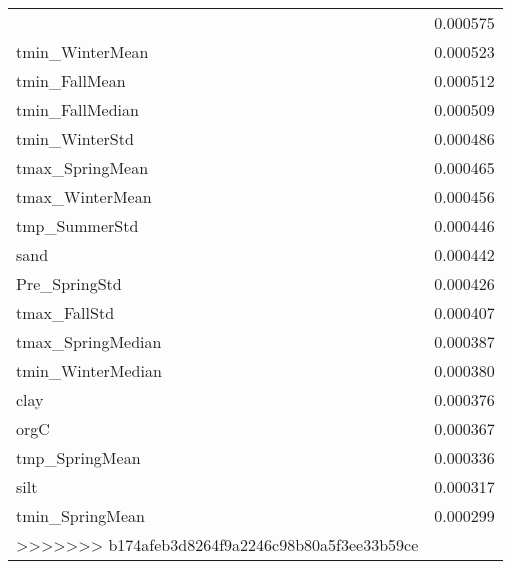 \begin{tabular}{lr}
\begin{tabular}{rrrrr}
tmp_WinterMedian & 0.000575 \\
tmin_WinterMean & 0.000523 \\
tmin_FallMean & 0.000512 \\
tmin_FallMedian & 0.000509 \\
tmin_WinterStd & 0.000486 \\
tmax_SpringMean & 0.000465 \\
tmax_WinterMean & 0.000456 \\
tmp_SummerStd & 0.000446 \\
sand & 0.000442 \\
Pre_SpringStd & 0.000426 \\
tmax_FallStd & 0.000407 \\
tmax_SpringMedian & 0.000387 \\
tmin_WinterMedian & 0.000380 \\
clay & 0.000376 \\
orgC & 0.000367 \\
tmp_SpringMean & 0.000336 \\
silt & 0.000317 \\
tmin_SpringMean & 0.000299 \\
>>>>>>> b174afeb3d8264f9a2246c98b80a5f3ee33b59ce
\bottomrule
\end{tabular}
